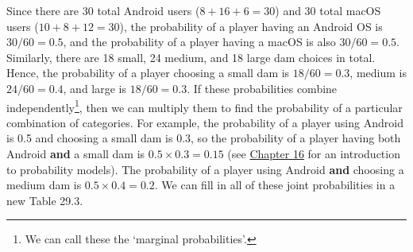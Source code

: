 \documentclass[
  openany]{krantz}
\begin{document}
Since there are 30 total Android users (\(8 + 16 + 6 = 30\)) and 30 total macOS users (\(10 + 8 + 12 = 30\)), the probability of a player having an Android OS is \(30/60 = 0.5\), and the probability of a player having a macOS is also \(30 / 60 = 0.5\).
Similarly, there are 18 small, 24 medium, and 18 large dam choices in total.
Hence, the probability of a player choosing a small dam is \(18/60 = 0.3\), medium is \(24/60 = 0.4\), and large is \(18/60 = 0.3\).
If these probabilities combine independently\footnote{We can call these the `marginal probabilities'.}, then we can multiply them to find the probability of a particular combination of categories.
For example, the probability of a player using Android is 0.5 and choosing a small dam is 0.3, so the probability of a player having both Android \textbf{and} a small dam is \(0.5 \times 0.3 = 0.15\) (see \protect\hyperlink{Chapter_16}{Chapter 16} for an introduction to probability models).
The probability of a player using Android \textbf{and} choosing a medium dam is \(0.5 \times 0.4 = 0.2\).
We can fill in all of these joint probabilities in a new Table 29.3.
\end{document}
